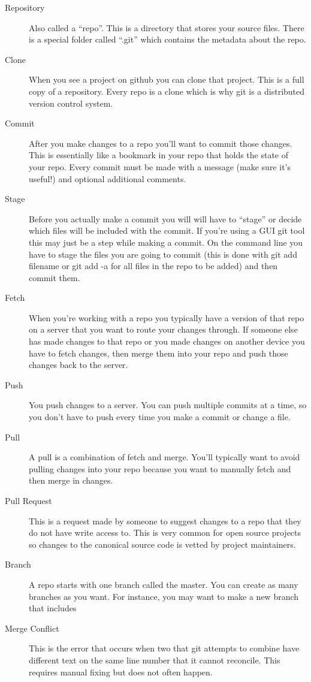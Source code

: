 \begin{description}
	\item[Repository] Also called a ``repo''. This is a directory that stores your source files. There is a special folder called ``.git'' which contains the metadata about the repo.
	\item[Clone] When you see a project on github you can clone that project. This is a full copy of a repository. Every repo is a clone which is why git is a distributed version control system. 
	\item[Commit] After you make changes to a repo you'll want to commit those changes. This is essentially like a bookmark in your repo that holds the state of your repo. Every commit must be made with a message (make sure it's useful!) and optional additional comments.
	\item[Stage] Before you actually make a commit you will will have to ``stage'' or decide which files will be included with the commit. If you're using a GUI git tool this may just be a step while making a commit. On the command line you have to stage the files you are going to commit (this is done with git add filename or git add -a for all files in the repo to be added) and then commit them.
	\item[Fetch] When you're working with a repo you typically have a version of that repo on a server that you want to route your changes through. If someone else has made changes to that repo or you made changes on another device you have to fetch changes, then merge them into your repo and push those changes back to the server.
	\item[Push] You push changes to a server. You can push multiple commits at a time, so you don't have to push every time you make a commit or change a file.
	\item[Pull] A pull is a combination of fetch and merge. You'll typically want to avoid pulling changes into your repo because you want to manually fetch and then merge in changes.
	\item[Pull Request] This is a request made by someone to suggest changes to a repo that they do not have write access to. This is very common for open source projects so changes to the canonical source code is vetted by project maintainers.
	\item[Branch] A repo starts with one branch called the master. You can create as many branches as you want. For instance, you may want to make a new branch that includes 
	\item[Merge Conflict] This is the error that occurs when two that git attempts to combine have different text on the same line number that it cannot reconcile. This requires manual fixing but does not often happen.

\end{description}
